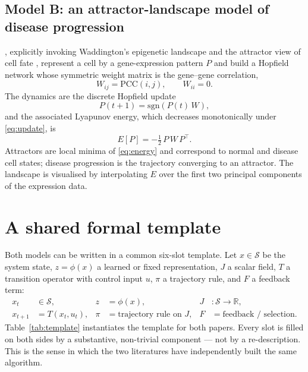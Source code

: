 \documentclass[11pt]{article}
\begin{document}
\subsection{Model B: an attractor-landscape model of disease progression}
\citet{fard2017attractor}, explicitly invoking Waddington's epigenetic landscape \citep{waddington1957strategy} and the
attractor view of cell fate \citep{huang2005cellfates,huang2009cancer}, represent a cell by a gene-expression pattern
$P$ and build a Hopfield network \citep{hopfield1982neural} whose symmetric weight matrix is the gene--gene
correlation,
\begin{equation}
W_{ij} = \mathrm{PCC}(i,j), \qquad W_{ii}=0 .
\label{eq:W}
\end{equation}
The dynamics are the discrete Hopfield update
\begin{equation}
P(t+1) = \mathrm{sgn}\!\left(P(t)\,W\right),
\label{eq:update}
\end{equation}
and the associated Lyapunov energy, which decreases monotonically under \eqref{eq:update}, is
\begin{equation}
E[P] = -\tfrac{1}{2}\,P\,W\,P^{\top}.
\label{eq:energy}
\end{equation}
Attractors are local minima of \eqref{eq:energy} and correspond to normal and disease cell states; disease
progression is the trajectory converging to an attractor. The landscape is visualised by interpolating $E$ over the
first two principal components of the expression data.

\section{A shared formal template}

Both models can be written in a common six-slot template. Let $x\in\mathcal{S}$ be the system state, $z=\phi(x)$ a
learned or fixed representation, $J$ a scalar field, $T$ a transition operator with control input $u$, $\pi$ a
trajectory rule, and $F$ a feedback term:
\begin{align}
x_t &\in \mathcal{S}, &
z &= \phi(x), &
J&:\mathcal{S}\rightarrow\mathbb{R}, \label{eq:tmpl1}\\
x_{t+1} &= T(x_t,u_t), &
\pi &= \text{trajectory rule on } J, &
F &= \text{feedback / selection}. \label{eq:tmpl2}
\end{align}
Table~\ref{tab:template} instantiates the template for both papers. Every slot is filled on both sides by a
substantive, non-trivial component --- not by a re-description. This is the sense in which the two literatures have
independently built the same algorithm.
\end{document}
